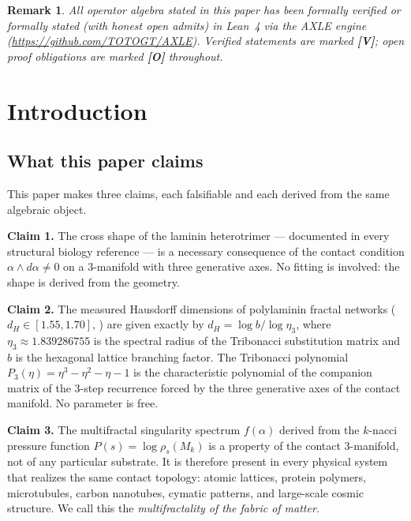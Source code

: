 \documentclass[12pt,a4paper]{article}
\newtheorem{remark}[theorem]{Remark}
\newcommand{\etatrib}{\eta_3}
\newcommand{\falph}{f(\alpha)}
\begin{document}
\begin{remark}
All operator algebra stated in this paper has been formally verified or
formally stated (with honest open admits) in Lean~4 via the AXLE engine
(\url{https://github.com/TOTOGT/AXLE}). Verified statements are marked
\textbf{[V]}; open proof obligations are marked \textbf{[O]} throughout.
\end{remark}


\section{Introduction}
\label{sec:intro}

\subsection{What this paper claims}

This paper makes three claims, each falsifiable and each derived from the
same algebraic object.

\medskip
\noindent\textbf{Claim 1.} The cross shape of the laminin heterotrimer ---
documented in every structural biology reference \cite{aumailley2013} --- is
a necessary consequence of the contact condition $\alpha\wedge d\alpha\neq 0$
on a 3-manifold with three generative axes. No fitting is involved: the
shape is derived from the geometry.

\medskip
\noindent\textbf{Claim 2.} The measured Hausdorff dimensions of polylaminin
fractal networks ($d_H\in[1.55,1.70]$, \cite{hochman2014}) are given
exactly by $d_H=\log b/\log\etatrib$, where $\etatrib\approx 1.839286755$
is the spectral radius of the Tribonacci substitution matrix and $b$ is the
hexagonal lattice branching factor. The Tribonacci polynomial $P_3(\eta)=
\eta^3-\eta^2-\eta-1$ is the characteristic polynomial of the companion
matrix of the 3-step recurrence forced by the three generative axes of the
contact manifold. No parameter is free.

\medskip
\noindent\textbf{Claim 3.} The multifractal singularity spectrum $\falph$
derived from the $k$-nacci pressure function $P(s)=\log\rho_s(M_k)$ is a
property of the contact 3-manifold, not of any particular substrate. It is
therefore present in every physical system that realizes the same contact
topology: atomic lattices, protein polymers, microtubules, carbon nanotubes,
cymatic patterns, and large-scale cosmic structure. We call this the
\emph{multifractality of the fabric of matter.}
\end{document}
